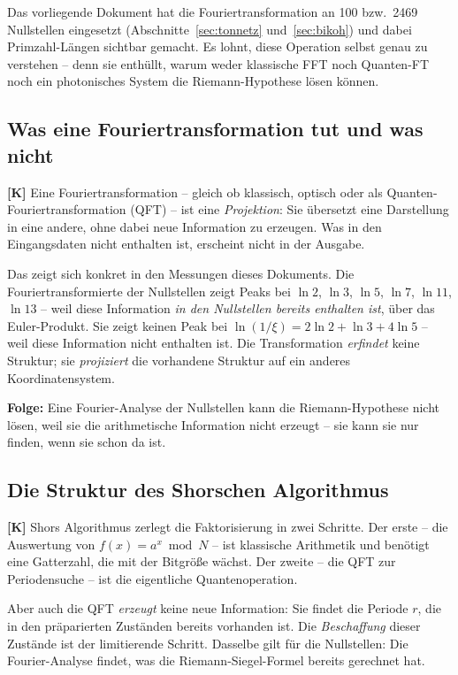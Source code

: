Das vorliegende Dokument hat die Fouriertransformation an 100 bzw.\ 2469
Nullstellen eingesetzt (Abschnitte~\ref{sec:tonnetz} und~\ref{sec:bikoh}) und
dabei Primzahl-L\"angen sichtbar gemacht. Es lohnt, diese Operation selbst genau
zu verstehen -- denn sie enth\"ullt, warum weder klassische FFT noch Quanten-FT
noch ein photonisches System die Riemann-Hypothese l\"osen k\"onnen.

\subsection{Was eine Fouriertransformation tut und was nicht}

\textbf{[K]} Eine Fouriertransformation -- gleich ob klassisch, optisch oder als
Quanten-Fouriertransformation (QFT) -- ist eine \emph{Projektion}: Sie
\"ubersetzt eine Darstellung in eine andere, ohne dabei neue Information zu
erzeugen. Was in den Eingangsdaten nicht enthalten ist, erscheint nicht in der
Ausgabe.

Das zeigt sich konkret in den Messungen dieses Dokuments. Die
Fouriertransformierte der Nullstellen zeigt Peaks bei $\ln 2$, $\ln 3$, $\ln 5$,
$\ln 7$, $\ln 11$, $\ln 13$ -- weil diese Information \emph{in den Nullstellen
bereits enthalten ist}, \"uber das Euler-Produkt. Sie zeigt keinen Peak bei
$\ln(1/\xi) = 2\ln2+\ln3+4\ln5$ -- weil diese Information nicht enthalten ist.
Die Transformation \emph{erfindet} keine Struktur; sie \emph{projiziert} die
vorhandene Struktur auf ein anderes Koordinatensystem.

\textbf{Folge:} Eine Fourier-Analyse der Nullstellen kann die
Riemann-Hypothese nicht l\"osen, weil sie die arithmetische Information nicht
erzeugt -- sie kann sie nur finden, wenn sie schon da ist.

\subsection{Die Struktur des Shorschen Algorithmus}

\textbf{[K]} Shors Algorithmus zerlegt die Faktorisierung in zwei Schritte.
Der erste -- die Auswertung von $f(x) = a^x \bmod N$ -- ist klassische
Arithmetik und ben\"otigt eine Gatterzahl, die mit der Bitgr\"o\ss e w\"achst.
Der zweite -- die QFT zur Periodensuche -- ist die eigentliche
Quantenoperation.

Aber auch die QFT \emph{erzeugt} keine neue Information: Sie findet die Periode
$r$, die in den pr\"aparierten Zust\"anden bereits vorhanden ist. Die
\emph{Beschaffung} dieser Zust\"ande ist der limitierende Schritt. Dasselbe
gilt f\"ur die Nullstellen: Die Fourier-Analyse findet, was die
Riemann-Siegel-Formel bereits gerechnet hat.

